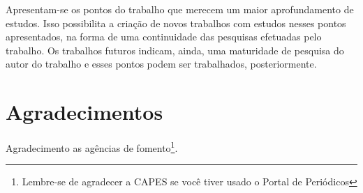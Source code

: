 \documentclass[12pt]{article}
\begin{document}
	Apresentam-se os pontos do trabalho que merecem um maior aprofundamento de estudos. Isso possibilita a criação de novos trabalhos com estudos nesses pontos apresentados, na forma de uma continuidade das pesquisas efetuadas pelo trabalho. Os trabalhos futuros indicam, ainda, uma maturidade de pesquisa do autor do trabalho e esses pontos podem ser trabalhados, posteriormente.
	
	\section*{Agradecimentos}
	Agradecimento as agências de fomento\footnote{Lembre-se de agradecer a CAPES se você tiver usado o Portal de Periódicos}.
	
    
	
	
\end{document}
